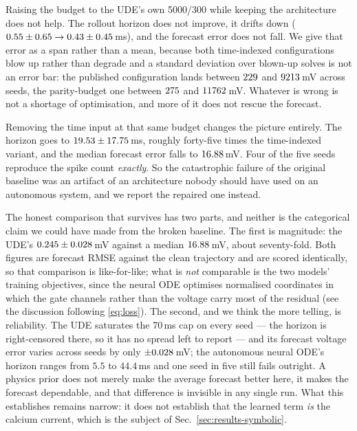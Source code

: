 \documentclass{article}
\newcommand{\Rcap}{70}         %
\newcommand{\AdamUde}{5000}    %
\newcommand{\BfgsUde}{300}     %
\begin{document}
Raising the budget to the UDE's own \AdamUde/\BfgsUde{} while keeping the
architecture does not help. The rollout horizon does not improve, it drifts down
($0.55 \pm 0.65 \to 0.43 \pm 0.45$\,ms), and
the forecast error does not fall. We give that error as a span rather than a
mean, because both time-indexed configurations blow up rather than degrade and a
standard deviation over blown-up solves is not an error bar: the published
configuration lands between $229$ and
$9213$\,mV across seeds, the parity-budget one between
$275$ and $11762$\,mV. Whatever is
wrong is not a shortage of optimisation, and more of it does not rescue the
forecast.

Removing the time input at that same budget changes the picture entirely. The
horizon goes to $19.53 \pm 17.75$\,ms, roughly forty-five times
the time-indexed variant, and the median forecast error falls to
$16.88$\,mV. Four of the five seeds reproduce the spike
count \emph{exactly}. So the catastrophic failure of the original baseline was an
artifact of an architecture nobody should have used on an autonomous system, and
we report the repaired one instead.

The honest comparison that survives has two parts, and neither is the categorical
claim we could have made from the broken baseline. The first is magnitude: the
UDE's $0.245 \pm 0.028$\,mV against a median
$16.88$\,mV, about seventy-fold. Both figures are
forecast RMSE against the clean trajectory and are scored identically, so that
comparison is like-for-like; what is \emph{not} comparable is the two models'
training objectives, since the neural ODE optimises normalised coordinates in
which the gate channels rather than the voltage carry most of the residual
(see the discussion following \eqref{eq:loss}). The second, and we think
the more telling, is reliability. The UDE saturates the \Rcap\,ms cap on every
seed --- the horizon is right-censored there, so it has no spread left to
report --- and its forecast voltage error varies across seeds by only
$\pm0.028$\,mV; the autonomous
neural ODE's horizon ranges from $5.5$ to $44.4$\,ms %
and one seed in five still fails outright. A physics prior does not merely make
the average forecast better here, it makes the forecast dependable, and that
difference is invisible in any single run. What this establishes remains narrow:
it does not establish that the learned term \emph{is} the calcium current, which
is the subject of Sec.~\ref{sec:results-symbolic}.
\end{document}

